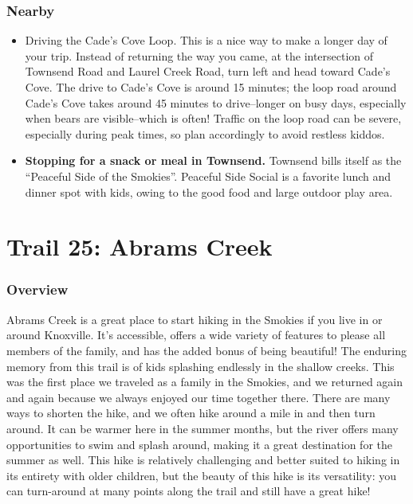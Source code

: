 \documentclass[
  letterpaper,
  DIV=11,
  numbers=noendperiod]{scrreprt}
\providecommand{\tightlist}{%
  \setlength{\itemsep}{0pt}\setlength{\parskip}{0pt}}\usepackage{longtable,booktabs,array}
\begin{document}
\subsection{Nearby}\label{nearby-23}

\begin{itemize}
\tightlist
\item
  Driving the Cade's Cove Loop. This is a nice way to make a longer day
  of your trip. Instead of returning the way you came, at the
  intersection of Townsend Road and Laurel Creek Road, turn left and
  head toward Cade's Cove. The drive to Cade's Cove is around 15
  minutes; the loop road around Cade's Cove takes around 45 minutes to
  drive--longer on busy days, especially when bears are visible--which
  is often! Traffic on the loop road can be severe, especially during
  peak times, so plan accordingly to avoid restless kiddos.
\item
  \textbf{Stopping for a snack or meal in Townsend.} Townsend bills
  itself as the ``Peaceful Side of the Smokies''. Peaceful Side Social
  is a favorite lunch and dinner spot with kids, owing to the good food
  and large outdoor play area.
\end{itemize}

\chapter{Trail 25: Abrams Creek}\label{trail-25-abrams-creek}

\subsection{Overview}\label{overview-25}

Abrams Creek is a great place to start hiking in the Smokies if you live
in or around Knoxville. It's accessible, offers a wide variety of
features to please all members of the family, and has the added bonus of
being beautiful! The enduring memory from this trail is of kids
splashing endlessly in the shallow creeks. This was the first place we
traveled as a family in the Smokies, and we returned again and again
because we always enjoyed our time together there. There are many ways
to shorten the hike, and we often hike around a mile in and then turn
around. It can be warmer here in the summer months, but the river offers
many opportunities to swim and splash around, making it a great
destination for the summer as well. This hike is relatively challenging
and better suited to hiking in its entirety with older children, but the
beauty of this hike is its versatility: you can turn-around at many
points along the trail and still have a great hike!
\end{document}
